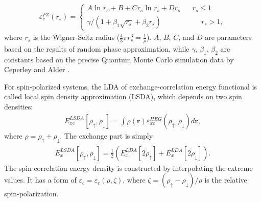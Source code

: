 	\begin{equation}
	\begin{aligned}
        \varepsilon_c^{PZ} (r_s)= 
        \begin{cases}
            A \text{ ln } r_s + B + Cr_s \text{ ln } r_s + Dr_s \hspace{20pt} r_s \le 1 \\
          \gamma/(1+\beta_1\sqrt{r_s}+\beta_2r_s) \hspace{67pt} r_s > 1,
    \end{cases}   
    \end{aligned}
	\end{equation}
where $r_s$ is the Wigner-Seitz radius ($\frac{4}{3}\pi r_s^3 = \frac{1}{\rho}$). $A$, $B$, $C$, and $D$ are parameters based on the results of random phase approximation, while $\gamma$, $\beta_1$, $\beta_2$ are constants based on the precise Quantum Monte Carlo simulation data by Ceperley and Alder \cite{ceperley1980ground}.

For spin-polarized systems, the LDA of exchange-correlation energy functional is called local spin density approximation (LSDA), which depends on two spin densities:
	\begin{equation}
	\begin{aligned}
        E_{xc}^{LSDA}[\rho_{\uparrow}, \rho_{\downarrow}] = \int \rho(\textbf{r}) \varepsilon_{xc}^{HEG}(\rho_{\uparrow}, \rho_{\downarrow}) d\textbf{r},
    \end{aligned}
	\end{equation}
where $\rho = \rho_{\uparrow}+\rho_{\downarrow}$. The exchange part is simply
	\begin{equation}
	\begin{aligned}
        E_{x}^{LSDA}[\rho_{\uparrow}, \rho_{\downarrow}] = \frac{1}{2} (E_{x}^{LDA}[2\rho_{\uparrow}]  + E_{x}^{LDA}[2\rho_{\downarrow}] ).
    \end{aligned}
	\end{equation}
The spin correlation energy density is constructed by interpolating the extreme values. It has a form of $\varepsilon_c = \varepsilon_c(\rho, \zeta)$, where $\zeta = (\rho_{\uparrow}-\rho_{\downarrow})/\rho $ is the relative spin-polarization. 

